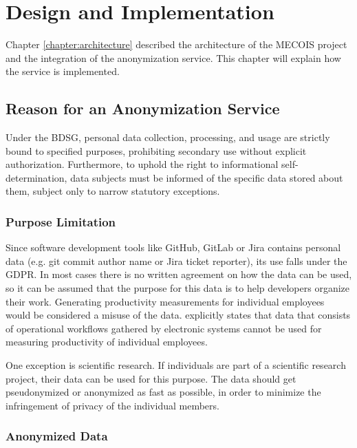 \chapter{Design and Implementation}
\label{chapter:design_and_implementation}

Chapter \ref{chapter:architecture} described the architecture of the MECOIS project and the integration of the anonymization service. This chapter will explain how the service is implemented.

\section{Reason for an Anonymization Service}
\label{sec:reason_for_a_anonymization_service}

Under the \ac{BDSG}, personal data collection, processing, and usage are strictly bound to specified purposes, prohibiting secondary use without explicit authorization. Furthermore, to uphold the right to informational self-determination, data subjects must be informed of the specific data stored about them, subject only to narrow statutory exceptions. \autocite[72,349]{daeubler2017glaeserne}

\subsection{Purpose Limitation}

Since software development tools like GitHub, GitLab or Jira contains personal data (e.g. git commit author name or Jira ticket reporter), its use falls under the \ac{GDPR}. In most cases there is no written agreement on how the data can be used, so it can be assumed that the purpose for this data is to help developers organize their work. Generating productivity measurements for individual employees would be considered a misuse of the data. \textcite[266--267]{daeubler2017glaeserne} explicitly states that data that consists of operational workflows gathered by electronic systems cannot be used for measuring productivity of individual employees. \autocite[266--267]{daeubler2017glaeserne}

One exception is scientific research. If individuals are part of a scientific research project, their data can be used for this purpose. The data should get pseudonymized or anonymized as fast as possible, in order to minimize the infringement of privacy of the individual members.\autocite[273--274]{daeubler2017glaeserne}

\subsection{Anonymized Data}

